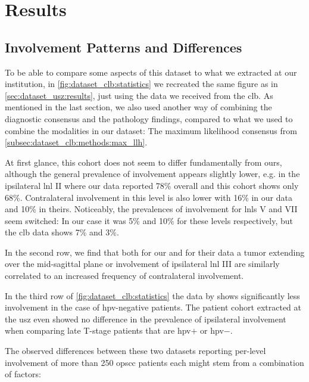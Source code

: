 \documentclass[\relativeRoot/main.tex]{subfiles}
\begin{document}
\section{Results}
\label{sec:dataset_clb:results}

\subsection*{Involvement Patterns and Differences}
\label{subsec:dataset_clb:results:patterns}

To be able to compare some aspects of this dataset to what we extracted at our institution, in \cref{fig:dataset_clb:statistics} we recreated the same figure as in \cref{sec:dataset_usz:results}, just using the data we received from the \acrlong{clb}. As mentioned in the last section, we also used another way of combining the diagnostic consensus and the pathology findings, compared to what we used to combine the modalities in our dataset: The maximum likelihood consensus from \cref{subsec:dataset_clb:methods:max_llh}.

At first glance, this cohort does not seem to differ fundamentally from ours, although the general prevalence of involvement appears slightly lower, e.g. in the ipsilateral \gls{lnl} II where our data reported 78\% overall and this cohort shows only 68\%. Contralateral involvement in this level is also lower with 16\% in our data and 10\% in theirs. Noticeably, the prevalences of involvement for \glspl{lnl} V and VII seem switched: In our case it was 5\% and 10\% for these levels respectively, but the \gls{clb} data shows 7\% and 3\%.

In the second row, we find that both for our and for their data a tumor extending over the mid-sagittal plane or involvement of ipsilateral \gls{lnl} III are similarly correlated to an increased frequency of contralateral involvement.

In the third row of \cref{fig:dataset_clb:statistics} the data by  shows significantly less involvement in the case of \gls{hpv}-negative patients. The patient cohort extracted at the \gls{usz} even showed no difference in the prevalence of ipsilateral involvement when comparing late T-stage patients that are \gls{hpv}$+$ or \gls{hpv}$-$.

The observed differences between these two datasets reporting per-level involvement of more than 250 \gls{opscc} patients each might stem from a combination of factors:
\end{document}
